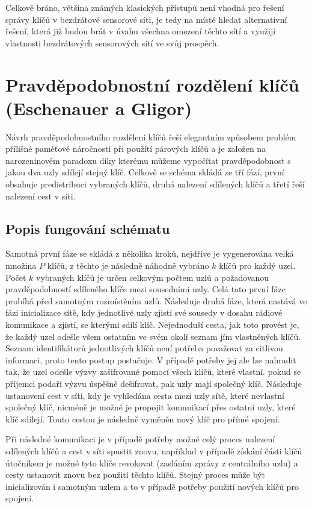 \documentclass[11pt,final,twoside]{fithesis2}
\begin{document}
Celkově bráno, většina známých klasických přístupů není vhodná pro řešení správy klíčů v bezdrátové sensorové síti, je tedy na místě hledat alternativní řešení,
která již budou brát v úvahu všechna omezení těchto sítí a využijí vlastnosti bezdrátových sensorových sítí ve svůj prospěch.

\section{Pravděpodobnostní rozdělení klíčů (Eschenauer a Gligor)} \label{sec:Eschenauer}
Návrh pravděpodobnostního rozdělení klíčů \cite{Eschenauer2002} řeší elegantním způsobem problém přílišné paměťové náročnosti při použití párových klíčů a je 
založen na narozeninovém paradoxu díky kterému můžeme vypočítat pravděpodobnost s jakou dva uzly sdílejí stejný klíč. 
Celkově se schéma skládá ze tří fází, první obsahuje predistribuci vybraných klíčů, druhá nalezení sdílených klíčů a třetí řeší nalezení cest v síti.

\subsection{Popis fungování schématu}
Samotná první fáze se skládá z několika kroků, nejdříve je vygenerována velká množina $P$ klíčů, z těchto je následně náhodně vybráno $k$ klíčů pro každý
uzel. Počet $k$ vybraných klíčů je určen celkovým počtem uzlů a požadovanou pravděpodobností sdíleného klíče mezi sousedními uzly. Celá tato první fáze 
probíhá před samotným rozmístěním uzlů. Následuje druhá fáze, která nastává ve fázi inicializace sítě, kdy jednotlivé uzly zjistí své sousedy v dosahu 
rádiové komunikace a zjistí, se kterými sdílí klíč. Nejednoduší cesta, jak toto provést je, že každý uzel odešle všem ostatním ve svém okolí seznam jím 
vlastněných klíčů. Seznam identifikátorů jednotlivých klíčů není potřeba považovat za citlivou informaci, proto tento postup postačuje. V případě potřeby 
jej ale lze nahradit tak, že uzel odešle výzvy zašifrované pomocí všech klíčů, které vlastní. pokud se příjemci podaří výzvu úspěšně dešifrovat, pak
uzly mají společný klíč. Následuje ustanovení cest v síti, kdy je vyhledána cesta mezi uzly sítě, které nevlastní společný klíč, nicméně je možné je propojit 
komunikací přes ostatní uzly, které klíč sdílejí. Touto cestou je následně vyměněn nový klíč pro přímé spojení. 

Při následné komunikaci je v případě potřeby možné celý proces nalezení sdílených klíčů a cest v síti spustit znovu, například v případě získání části klíčů útočníkem
je možné tyto klíče revokovat (zasláním zprávy z centrálního uzlu) a cesty ustanovit znovu bez použití těchto klíčů. Stejný proces může být inicializován i samotným uzlem
a to v případě potřeby použití nových klíčů pro spojení. 
\end{document}
